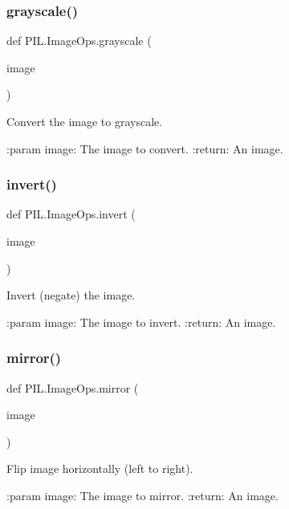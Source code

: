 \subsubsection{\texorpdfstring{grayscale()}{grayscale()}}
{\footnotesize\ttfamily def P\+I\+L.\+Image\+Ops.\+grayscale (\begin{DoxyParamCaption}\item[{}]{image }\end{DoxyParamCaption})}

\begin{DoxyVerb}Convert the image to grayscale.

:param image: The image to convert.
:return: An image.
\end{DoxyVerb}
 \mbox{\label{namespacePIL_1_1ImageOps_a8619286122091c6be089d3821e03fb73}} 
\subsubsection{\texorpdfstring{invert()}{invert()}}
{\footnotesize\ttfamily def P\+I\+L.\+Image\+Ops.\+invert (\begin{DoxyParamCaption}\item[{}]{image }\end{DoxyParamCaption})}

\begin{DoxyVerb}Invert (negate) the image.

:param image: The image to invert.
:return: An image.
\end{DoxyVerb}
 \mbox{\label{namespacePIL_1_1ImageOps_a42e210667db8aeb87a999cbb7033908b}} 
\subsubsection{\texorpdfstring{mirror()}{mirror()}}
{\footnotesize\ttfamily def P\+I\+L.\+Image\+Ops.\+mirror (\begin{DoxyParamCaption}\item[{}]{image }\end{DoxyParamCaption})}

\begin{DoxyVerb}Flip image horizontally (left to right).

:param image: The image to mirror.
:return: An image.
\end{DoxyVerb}
 \mbox{\label{namespacePIL_1_1ImageOps_ab6b83ba1edb453e1fa135e996035817b}} 
